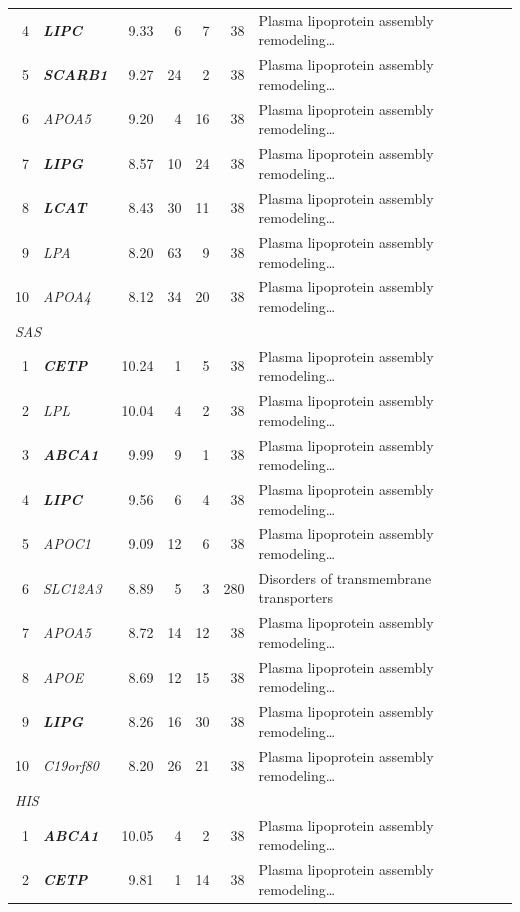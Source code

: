 \begin{table}[!t]
\begin{tabular}{rlrrrrl}
4 & \textbf{\textit{LIPC}} & 9.33 & 6 & 7 & 38 & Plasma lipoprotein assembly remodeling\ldots \\
5 & \textbf{\textit{SCARB1}} & 9.27 & 24 & 2 & 38 & Plasma lipoprotein assembly remodeling\ldots \\
6 & \textit{APOA5} & 9.20 & 4 & 16 & 38 & Plasma lipoprotein assembly remodeling\ldots \\
7 & \textbf{\textit{LIPG}} & 8.57 & 10 & 24 & 38 & Plasma lipoprotein assembly remodeling\ldots \\
8 & \textbf{\textit{LCAT}} & 8.43 & 30 & 11 & 38 & Plasma lipoprotein assembly remodeling\ldots \\
9 & \textit{LPA} & 8.20 & 63 & 9 & 38 & Plasma lipoprotein assembly remodeling\ldots \\
10 & \textit{APOA4} & 8.12 & 34 & 20 & 38 & Plasma lipoprotein assembly remodeling\ldots \\
\multicolumn{7}{l}{\textit{SAS}} \\
1 & \textbf{\textit{CETP}} & 10.24 & 1 & 5 & 38 & Plasma lipoprotein assembly remodeling\ldots \\
2 & \textit{LPL} & 10.04 & 4 & 2 & 38 & Plasma lipoprotein assembly remodeling\ldots \\
3 & \textbf{\textit{ABCA1}} & 9.99 & 9 & 1 & 38 & Plasma lipoprotein assembly remodeling\ldots \\
4 & \textbf{\textit{LIPC}} & 9.56 & 6 & 4 & 38 & Plasma lipoprotein assembly remodeling\ldots \\
5 & \textit{APOC1} & 9.09 & 12 & 6 & 38 & Plasma lipoprotein assembly remodeling\ldots \\
6 & \textit{SLC12A3} & 8.89 & 5 & 3 & 280 & Disorders of transmembrane transporters \\
7 & \textit{APOA5} & 8.72 & 14 & 12 & 38 & Plasma lipoprotein assembly remodeling\ldots \\
8 & \textit{APOE} & 8.69 & 12 & 15 & 38 & Plasma lipoprotein assembly remodeling\ldots \\
9 & \textbf{\textit{LIPG}} & 8.26 & 16 & 30 & 38 & Plasma lipoprotein assembly remodeling\ldots \\
10 & \textit{C19orf80} & 8.20 & 26 & 21 & 38 & Plasma lipoprotein assembly remodeling\ldots \\
\multicolumn{7}{l}{\textit{HIS}} \\
1 & \textbf{\textit{ABCA1}} & 10.05 & 4 & 2 & 38 & Plasma lipoprotein assembly remodeling\ldots \\
2 & \textbf{\textit{CETP}} & 9.81 & 1 & 14 & 38 & Plasma lipoprotein assembly remodeling\ldots \\

\end{tabular}
\end{table}
